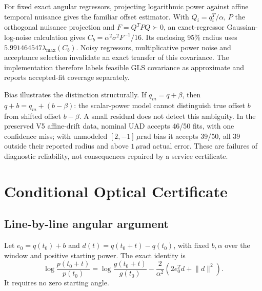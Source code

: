 \documentclass[10pt,journal]{IEEEtran}
\newcommand{\norm}[1]{\lVert#1\rVert}
\newcommand{\um}{\,\mu\mathrm{rad}}
\begin{document}
For fixed exact angular regressors, projecting logarithmic power against affine temporal nuisance gives the familiar offset estimator. With $Q_i=q_i^T/\alpha$, $P$ the orthogonal nuisance projection and $F=Q^TPQ\succ0$, an exact-regressor Gaussian-log-noise calculation gives $C_b=\alpha^2\sigma^2F^{-1}/16$. Its enclosing 95\% radius uses $5.991464547\lambda_{\max}(C_b)$. Noisy regressors, multiplicative power noise and acceptance selection invalidate an exact transfer of this covariance. The implementation therefore labels feasible GLS covariance as approximate and reports accepted-fit coverage separately.

Bias illustrates the distinction structurally. If $q_m=q+\beta$, then $q+b=q_m+(b-\beta)$: the scalar-power model cannot distinguish true offset $b$ from shifted offset $b-\beta$. A small residual does not detect this ambiguity. In the preserved V5 affine-drift data, nominal UAD accepts 46/50 fits, with one confidence miss; with unmodeled $[2,-1]\um$ bias it accepts 39/50, all 39 outside their reported radius and above $1\um$ actual error. These are failures of diagnostic reliability, not consequences repaired by a service certificate.

\section{Conditional Optical Certificate}
\subsection{Line-by-line angular argument}
Let $e_0=q(t_0)+b$ and $d(t)=q(t_0+t)-q(t_0)$, with fixed $b,\alpha$ over the window and positive starting power. The exact identity is
\begin{equation}
\log\frac{p(t_0+t)}{p(t_0)}=\log\frac{g(t_0+t)}{g(t_0)}-\frac{2}{\alpha^2}(2e_0^Td+\norm d^2).
\end{equation}
It requires no zero starting angle.
\end{document}
